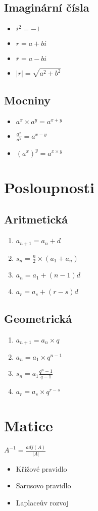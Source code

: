 \documentclass{article}
\begin{document}
\begin{multicols}{4}
\subsection{Imaginární čísla}
\begin{itemize}
    \item $i^{2}=-1$
    \item $r=a+bi$
    \item $\overline{r}=a-bi$
    \item $\left|r\right|=\sqrt{a^{2}+b^{2}}$
\end{itemize}
\subsection{Mocniny}
\begin{itemize}
    \item $a^{x}\times a^{y}=a^{x+y}$
    \item $\frac{a^{x}}{a^{y}}=a^{x-y}$
    \item $\left(a^{x}\right)^{y}=a^{x\times y}$
\end{itemize}
\section{Posloupnosti}
\subsection{Aritmetická}
\begin{enumerate}
    \item $a_{n+1}=a_{n}+d$
    \item $s_{n}=\frac{n}{2}\times\left(a_{1}+a_{n}\right)$
    \item $a_{n}=a_{1}+\left(n-1\right)d$
    \item $a_{r}=a_{s}+\left(r-s\right)d$
\end{enumerate}
\subsection{Geometrická}
\begin{enumerate}
    \item $a_{n+1}=a_{n}\times q$
    \item $a_{n}=a_{1}\times q^{n-1}$
    \item $s_{n}=a_{1}\frac{q^{n}-1}{q-1}$
    \item $a_{r}=a_{s}\times q^{r-s}$
\end{enumerate}
\section{Matice}
$A^{-1}=\frac{adj\left(A\right)}{\left|A\right|}$
\begin{itemize}
    \item Křížové pravidlo
    \item Sarusovo pravidlo
    \item Laplaceův rozvoj
\end{itemize}

\end{multicols}
\end{document}
